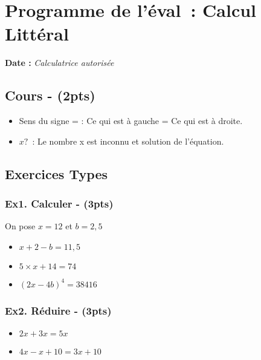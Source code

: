 



\section*{Programme de l’éval : Calcul Littéral}

\textbf{Date : } \hspace{4cm} \textit{Calculatrice autorisée}

\subsection*{Cours - (2pts)}


\begin{itemize}[label={$\bullet$}]
  \item Sens du signe = : Ce qui est à gauche = Ce qui est à droite. 
  \item $x ?$ : Le nombre x est inconnu et solution de l’équation. 
\end{itemize}

\subsection*{Exercices Types}

\subsubsection*{Ex1. Calculer - (3pts)}

On pose $x = 12$ et $b = 2,5$

\begin{itemize}[label={$\bullet$}]
  \item  $x + 2 - b = 11,5$
  \item  $5 \times x + 14 = 74$
  \item  $(2x - 4b)^4 = \SI{38416}{}$
\end{itemize}


\subsubsection*{Ex2. Réduire - (3pts)}

\begin{itemize}[label={$\bullet$}]
  \item $2x + 3x = 5x$
  \item $4x - x + 10 = 3x +10$
\end{itemize}

